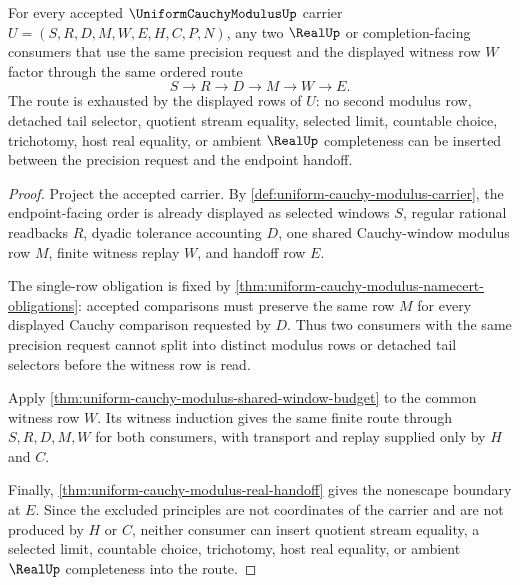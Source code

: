 \begin{theorem}\label{thm:uniform-cauchy-modulus-single-route-exhaustion}
For every accepted $\UniformCauchyModulusUp$ carrier $U=(S,R,D,M,W,E,H,C,P,N)$, any two $\RealUp$ or completion-facing consumers that use the same precision request and the displayed witness row $W$ factor through the same ordered route
$$
S \longrightarrow R \longrightarrow D \longrightarrow M \longrightarrow W \longrightarrow E .
$$
The route is exhausted by the displayed rows of $U$: no second modulus row, detached tail selector, quotient stream equality, selected limit, countable choice, trichotomy, host real equality, or ambient $\RealUp$ completeness can be inserted between the precision request and the endpoint handoff.
\end{theorem}
\begin{proof}
Project the accepted carrier. By \autoref{def:uniform-cauchy-modulus-carrier}, the endpoint-facing order is already displayed as selected windows $S$, regular rational readbacks $R$, dyadic tolerance accounting $D$, one shared Cauchy-window modulus row $M$, finite witness replay $W$, and handoff row $E$.

The single-row obligation is fixed by \autoref{thm:uniform-cauchy-modulus-namecert-obligations}: accepted comparisons must preserve the same row $M$ for every displayed Cauchy comparison requested by $D$. Thus two consumers with the same precision request cannot split into distinct modulus rows or detached tail selectors before the witness row is read.

Apply \autoref{thm:uniform-cauchy-modulus-shared-window-budget} to the common witness row $W$. Its witness induction gives the same finite route through $S,R,D,M,W$ for both consumers, with transport and replay supplied only by $H$ and $C$.

Finally, \autoref{thm:uniform-cauchy-modulus-real-handoff} gives the nonescape boundary at $E$. Since the excluded principles are not coordinates of the carrier and are not produced by $H$ or $C$, neither consumer can insert quotient stream equality, a selected limit, countable choice, trichotomy, host real equality, or ambient $\RealUp$ completeness into the route.
\end{proof}

